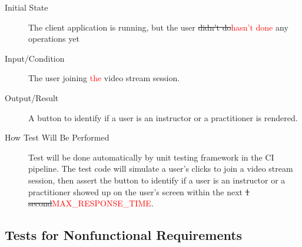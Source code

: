 \documentclass[12pt, titlepage]{article}
\newcommand{\rt}[1]{\textcolor{red}{#1}}
\begin{document}
\begin{enumerate}[FR-T1]
\begin{description}
  \item[Initial State] The client application is running, but the user \sout{didn’t do}\rt{hasn’t done}
    any operations yet
  \item[Input/Condition] The user joining \rt{the} video stream session.
  \item[Output/Result] A button to identify if a user is an instructor or a
    practitioner is rendered.
  \item[How Test Will Be Performed] Test will be done automatically by unit
    testing framework in the CI pipeline. The test code will simulate a user's
    clicks to join a video stream session, then assert the button to identify if
    a user is an instructor or a practitioner showed up on the user's screen
    within the next \sout{1 second}\rt{MAX\_RESPONSE\_TIME}.
  \end{description}
\end{enumerate}

\subsection{Tests for Nonfunctional Requirements}
\end{document}
